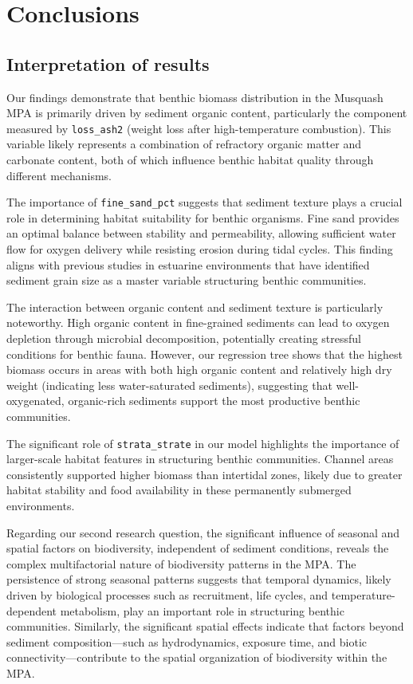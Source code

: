 \documentclass[12pt]{article}
\begin{document}
\newpage
\section{Conclusions}
\subsection{Interpretation of results}

\qquad Our findings demonstrate that benthic biomass distribution in the Musquash MPA is primarily driven by sediment organic content, particularly the component measured by \texttt{loss\_ash2} (weight loss after high-temperature combustion). This variable likely represents a combination of refractory organic matter and carbonate content, both of which influence benthic habitat quality through different mechanisms.

\qquad The importance of \texttt{fine\_sand\_pct} suggests that sediment texture plays a crucial role in determining habitat suitability for benthic organisms. Fine sand provides an optimal balance between stability and permeability, allowing sufficient water flow for oxygen delivery while resisting erosion during tidal cycles. This finding aligns with previous studies in estuarine environments that have identified sediment grain size as a master variable structuring benthic communities\cite{glud2008oxygen}.

\qquad The interaction between organic content and sediment texture is particularly noteworthy. High organic content in fine-grained sediments can lead to oxygen depletion through microbial decomposition, potentially creating stressful conditions for benthic fauna. However, our regression tree shows that the highest biomass occurs in areas with both high organic content and relatively high dry weight (indicating less water-saturated sediments), suggesting that well-oxygenated, organic-rich sediments support the most productive benthic communities.

\qquad The significant role of \texttt{strata\_strate} in our model highlights the importance of larger-scale habitat features in structuring benthic communities. Channel areas consistently supported higher biomass than intertidal zones, likely due to greater habitat stability and food availability in these permanently submerged environments.

\qquad Regarding our second research question, the significant influence of seasonal and spatial factors on biodiversity, independent of sediment conditions, reveals the complex multifactorial nature of biodiversity patterns in the MPA. The persistence of strong seasonal patterns suggests that temporal dynamics, likely driven by biological processes such as recruitment, life cycles, and temperature-dependent metabolism, play an important role in structuring benthic communities. Similarly, the significant spatial effects indicate that factors beyond sediment composition—such as hydrodynamics, exposure time, and biotic connectivity—contribute to the spatial organization of biodiversity within the MPA.
\end{document}
